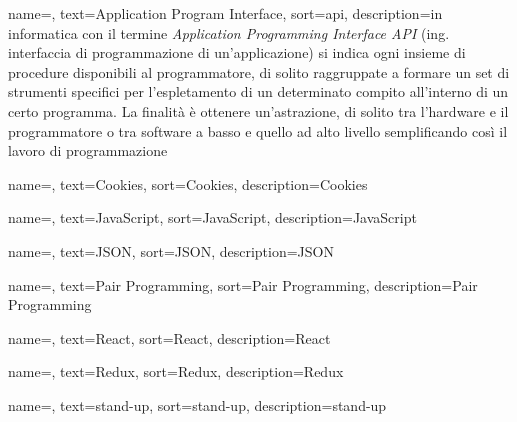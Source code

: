 
\renewcommand{\acronymname}{Acronimi e abbreviazioni}




{
    name=,
    text=Application Program Interface,
    sort=api,
    description={in informatica con il termine \emph{Application Programming Interface API} (ing. interfaccia di programmazione di un'applicazione) si indica ogni insieme di procedure disponibili al programmatore, di solito raggruppate a formare un set di strumenti specifici per l'espletamento di un determinato compito all'interno di un certo programma. La finalità è ottenere un'astrazione, di solito tra l'hardware e il programmatore o tra software a basso e quello ad alto livello semplificando così il lavoro di programmazione}
}

{
    name=,
    text=Cookies,
    sort=Cookies,
    description={Cookies}
}

{
    name=,
    text=JavaScript,
    sort=JavaScript,
    description={JavaScript}
}

{
    name=,
    text=JSON,
    sort=JSON,
    description={JSON}
}

{
    name=,
    text=Pair Programming,
    sort=Pair Programming,
    description={Pair Programming}
}

{
    name=,
    text=React,
    sort=React,
    description={React}
}

{
    name=,
    text=Redux,
    sort=Redux,
    description={Redux}
}

{
    name=,
    text=stand-up,
    sort=stand-up,
    description={stand-up}
}

